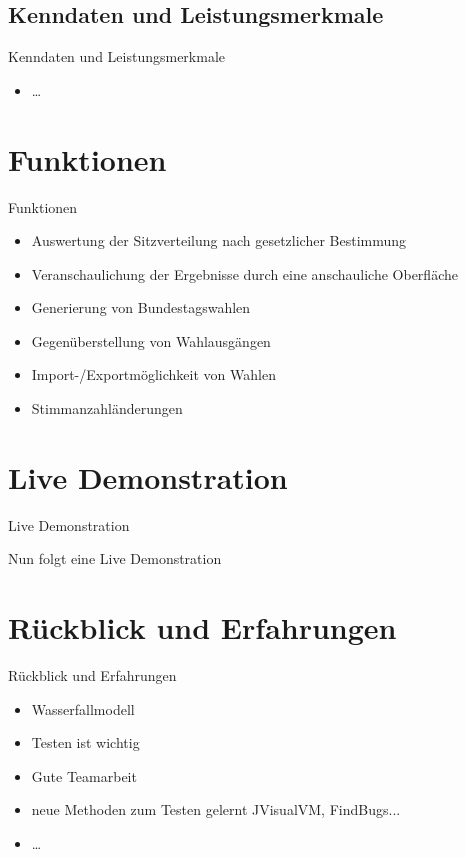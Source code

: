 \documentclass[18pt]{beamer}
\begin{document}
\subsection{Kenndaten und Leistungsmerkmale}
\begin{frame}{Kenndaten und Leistungsmerkmale}
\begin{itemize}
	\item \dots
\end{itemize}
\end{frame}


\section{Funktionen}
\begin{frame}{Funktionen}
\begin{itemize}
	\item Auswertung der Sitzverteilung nach gesetzlicher Bestimmung
	\item Veranschaulichung der Ergebnisse durch eine anschauliche Oberfläche
	\item Generierung von Bundestagswahlen
	\item Gegenüberstellung von Wahlausgängen
	\item Import-/Exportmöglichkeit von Wahlen
	\item Stimmanzahländerungen
\end{itemize}
\end{frame}

\section{Live Demonstration}
\begin{frame}{Live Demonstration}
\begin{LARGE}
\begin{center}
	Nun folgt eine Live Demonstration
\end{center}
\end{LARGE}
\end{frame}

\section{Rückblick und Erfahrungen}
\begin{frame}{Rückblick und Erfahrungen}
\begin{itemize}
	\item Wasserfallmodell
	\item Testen ist wichtig
	\item Gute Teamarbeit
	\item neue Methoden zum Testen gelernt JVisualVM, FindBugs...
	\item \dots
\end{itemize}
\end{frame}
\end{document}
